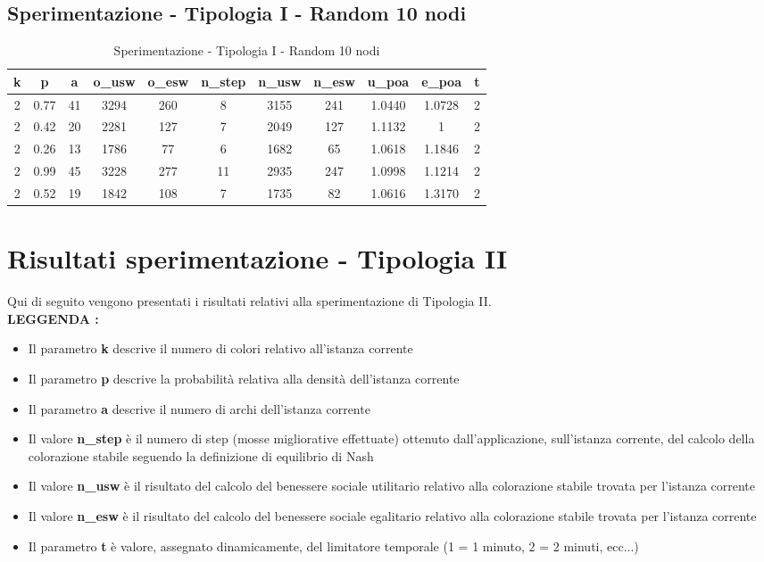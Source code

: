 \subsection{Sperimentazione - Tipologia I - Random 10 nodi}

\begin{table}[H]
\centering
\scalebox{0.9} {
\begin{tabular}{|c|c|c|c|c|c|c|c|c|c|c|}
\hline
\textbf{k} & \textbf{p} & \textbf{a} & \textbf{o\_usw} & \textbf{o\_esw} & \textbf{n\_step} & \textbf{n\_usw} & \textbf{n\_esw} & \textbf{u\_poa} & \textbf{e\_poa} & \textbf{t} \\ \hline
2 & 0.77 & 41 & 3294 & 260 & 8 & 3155 & 241 & 1.0440 & 1.0728 & 2 \\ \hline
2 & 0.42 & 20 & 2281 & 127 & 7 & 2049 & 127 & 1.1132 & 1 & 2 \\ \hline
2 & 0.26 & 13 & 1786 & 77 & 6 & 1682 & 65 & 1.0618 & 1.1846 & 2 \\ \hline
2 & 0.99 & 45 & 3228 & 277 & 11 & 2935 & 247 & 1.0998 & 1.1214 & 2 \\ \hline
2 & 0.52 & 19 & 1842 & 108 & 7 & 1735 & 82 & 1.0616 & 1.3170 & 2 \\ \hline
\end{tabular}
}
\caption{Sperimentazione - Tipologia I - Random 10 nodi}
\label{tab:sperimentazione-tipo1-10nodi}
\end{table}

\section{Risultati sperimentazione - Tipologia II}
\justify
Qui di seguito vengono presentati i risultati relativi alla sperimentazione di Tipologia II.\\

\textbf{LEGGENDA : }

\begin{itemize}
	\item Il parametro \textbf{k} descrive il numero di colori relativo all'istanza corrente
	\item Il parametro \textbf{p} descrive la probabilità relativa alla densità dell'istanza corrente
	\item Il parametro \textbf{a} descrive il numero di archi dell'istanza corrente
	\item Il valore \textbf{n\_step} è il numero di step (mosse migliorative effettuate) ottenuto dall'applicazione, sull'istanza corrente, del calcolo della colorazione stabile seguendo la definizione di equilibrio di Nash
	\item Il valore \textbf{n\_usw} è il risultato del calcolo del benessere sociale utilitario relativo alla colorazione stabile trovata per l'istanza corrente
	\item Il valore \textbf{n\_esw} è il risultato del calcolo del benessere sociale egalitario relativo alla colorazione stabile trovata per l'istanza corrente
	\item Il parametro \textbf{t} è valore, assegnato dinamicamente, del limitatore temporale (1 = 1 minuto, 2 = 2 minuti, ecc...)
\end{itemize}

